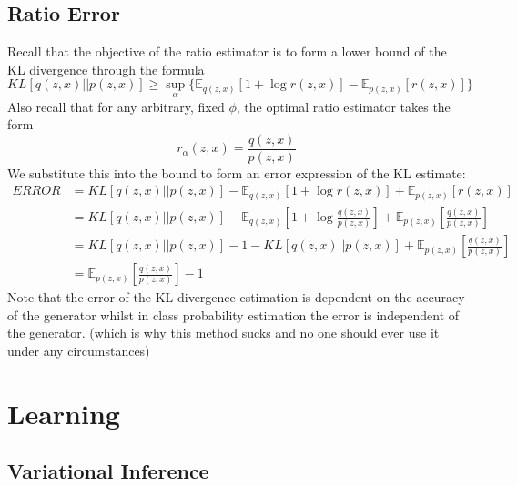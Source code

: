 \documentclass[a4paper,12pt]{article}
\newcommand{\E}{\mathbb{E}}
\numberwithin{equation}{section}
\begin{document}
\subsection{Ratio Error}
Recall that the objective of the ratio estimator is to form a lower bound of the KL divergence through the formula
\[KL[q(z,x)||p(z,x)]\geq \sup_\alpha \{\E_{q(z,x)}[1+\log r(z,x)]-\E_{p(z,x)}[r(z,x)]\}\]
Also recall that for any arbitrary, fixed $\phi$, the optimal ratio estimator takes the form
\[r_\alpha(z,x)=\frac{q(z,x)}{p(z,x)}\]
We substitute this into the bound to form an error expression of the KL estimate:
\begin{align*}
ERROR&=KL[q(z,x)||p(z,x)]-\E_{q(z,x)}[1+\log r(z,x)]+\E_{p(z,x)}[r(z,x)]\\
&=KL[q(z,x)||p(z,x)]-\E_{q(z,x)}\left[1+\log \frac{q(z,x)}{p(z,x)}\right]+\E_{p(z,x)}\left[\frac{q(z,x)}{p(z,x)}\right]\\
&=KL[q(z,x)||p(z,x)]-1-KL[q(z,x)||p(z,x)]+\E_{p(z,x)}\left[\frac{q(z,x)}{p(z,x)}\right]\\
&=\E_{p(z,x)}\left[\frac{q(z,x)}{p(z,x)}\right]-1
\end{align*}
Note that the error of the KL divergence estimation is dependent on the accuracy of the generator whilst in class probability estimation the error is independent of the generator. (which is why this method sucks and no one should ever use it under any circumstances)
\newpage
\section{Learning}
\subsection{Variational Inference}
\end{document}
